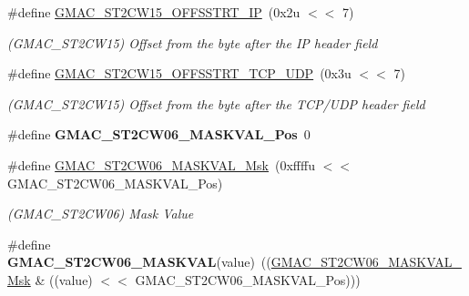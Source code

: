 \begin{DoxyCompactItemize}
\mbox{\label{group__SAMV71__GMAC_ga6fe7a3c1c257b8764c0abd8112e6f656}} 
\#define \mbox{\hyperlink{group__SAMV71__GMAC_ga6fe7a3c1c257b8764c0abd8112e6f656}{G\+M\+A\+C\+\_\+\+S\+T2\+C\+W15\+\_\+\+O\+F\+F\+S\+S\+T\+R\+T\+\_\+\+IP}}~(0x2u $<$$<$ 7)
\begin{DoxyCompactList}\small\item\em (G\+M\+A\+C\+\_\+\+S\+T2\+C\+W15) Offset from the byte after the IP header field \end{DoxyCompactList}\item 
\mbox{\label{group__SAMV71__GMAC_ga807bc6f0619c7afb33746d81aa88f5d7}} 
\#define \mbox{\hyperlink{group__SAMV71__GMAC_ga807bc6f0619c7afb33746d81aa88f5d7}{G\+M\+A\+C\+\_\+\+S\+T2\+C\+W15\+\_\+\+O\+F\+F\+S\+S\+T\+R\+T\+\_\+\+T\+C\+P\+\_\+\+U\+DP}}~(0x3u $<$$<$ 7)
\begin{DoxyCompactList}\small\item\em (G\+M\+A\+C\+\_\+\+S\+T2\+C\+W15) Offset from the byte after the T\+C\+P/\+U\+DP header field \end{DoxyCompactList}\item 
\mbox{\label{group__SAMV71__GMAC_ga8f06923bbc78f6262a61f6b96697ea74}} 
\#define {\bfseries G\+M\+A\+C\+\_\+\+S\+T2\+C\+W06\+\_\+\+M\+A\+S\+K\+V\+A\+L\+\_\+\+Pos}~0
\item 
\mbox{\label{group__SAMV71__GMAC_gab9551388c104d77140ec7670de967181}} 
\#define \mbox{\hyperlink{group__SAMV71__GMAC_gab9551388c104d77140ec7670de967181}{G\+M\+A\+C\+\_\+\+S\+T2\+C\+W06\+\_\+\+M\+A\+S\+K\+V\+A\+L\+\_\+\+Msk}}~(0xffffu $<$$<$ G\+M\+A\+C\+\_\+\+S\+T2\+C\+W06\+\_\+\+M\+A\+S\+K\+V\+A\+L\+\_\+\+Pos)
\begin{DoxyCompactList}\small\item\em (G\+M\+A\+C\+\_\+\+S\+T2\+C\+W06) Mask Value \end{DoxyCompactList}\item 
\mbox{\label{group__SAMV71__GMAC_gafe28d31773ba597b687dc6c5b5a4c036}} 
\#define {\bfseries G\+M\+A\+C\+\_\+\+S\+T2\+C\+W06\+\_\+\+M\+A\+S\+K\+V\+AL}(value)~((\mbox{\hyperlink{group__SAMV71__GMAC_gab9551388c104d77140ec7670de967181}{G\+M\+A\+C\+\_\+\+S\+T2\+C\+W06\+\_\+\+M\+A\+S\+K\+V\+A\+L\+\_\+\+Msk}} \& ((value) $<$$<$ G\+M\+A\+C\+\_\+\+S\+T2\+C\+W06\+\_\+\+M\+A\+S\+K\+V\+A\+L\+\_\+\+Pos)))

\end{DoxyCompactItemize}
